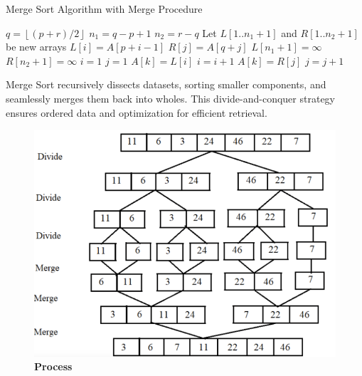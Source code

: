 \documentclass[12pt,twocolumn]{article}
\begin{document}
\begin{algorithm}[H]
\caption{Merge Sort Algorithm with Merge Procedure}\label{alg:merge_sort}
\begin{algorithmic}[1] %
        \State $q = \left\lfloor (p + r) / 2 \right\rfloor$
        \State {}
        \State {}
        \State {}
    \EndIf
\EndProcedure
\Statex
{}
    \State $n_1 = q - p + 1$
    \State $n_2 = r - q$
    \State Let $L[1..n_1 + 1]$ and $R[1..n_2 + 1]$ be new arrays
        \State $L[i] = A[p + i - 1]$
    \EndFor
        \State $R[j] = A[q + j]$
    \EndFor
    \State $L[n_1 + 1] = \infty$
    \State $R[n_2 + 1] = \infty$
    \State $i = 1$
    \State $j = 1$
            \State $A[k] = L[i]$
            \State $i = i + 1$
        \Else
            \State $A[k] = R[j]$
            \State $j = j + 1$
        \EndIf
    \EndFor
\EndProcedure
\end{algorithmic}
\end{algorithm}
\cite{cormen2009introduction}
Merge Sort recursively dissects datasets, sorting smaller components, and seamlessly merges them back into wholes. This divide-and-conquer strategy ensures ordered data and optimization for efficient retrieval.
\clearpage

\begin{figure}
  \centering
  \includegraphics[width=0.8\linewidth]{image.png} 
  \caption{\textbf{Process}}
  \label{fig:my_label}
\end{figure}
\end{document}
